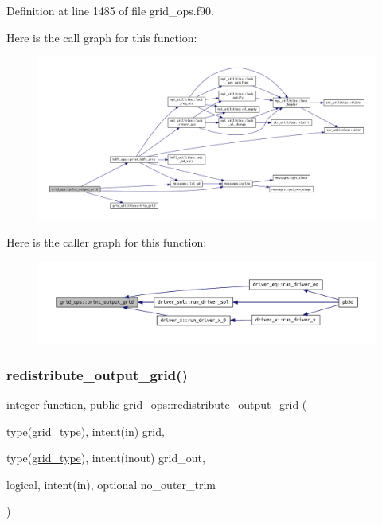 Definition at line 1485 of file grid\+\_\+ops.\+f90.

Here is the call graph for this function\+:\nopagebreak
\begin{figure}[H]
\begin{center}
\leavevmode
\includegraphics[width=350pt]{namespacegrid__ops_a4827e794d37334c0cad9bb2016e64d46_cgraph}
\end{center}
\end{figure}
Here is the caller graph for this function\+:\nopagebreak
\begin{figure}[H]
\begin{center}
\leavevmode
\includegraphics[width=350pt]{namespacegrid__ops_a4827e794d37334c0cad9bb2016e64d46_icgraph}
\end{center}
\end{figure}
\mbox{\label{namespacegrid__ops_ab10ef5b486ee3861df2da4e53bc22630}} 
\subsubsection{\texorpdfstring{redistribute\+\_\+output\+\_\+grid()}{redistribute\_output\_grid()}}
{\footnotesize\ttfamily integer function, public grid\+\_\+ops\+::redistribute\+\_\+output\+\_\+grid (\begin{DoxyParamCaption}\item[{type(\hyperlink{structgrid__vars_1_1grid__type}{grid\+\_\+type}), intent(in)}]{grid,  }\item[{type(\hyperlink{structgrid__vars_1_1grid__type}{grid\+\_\+type}), intent(inout)}]{grid\+\_\+out,  }\item[{logical, intent(in), optional}]{no\+\_\+outer\+\_\+trim }\end{DoxyParamCaption})}



